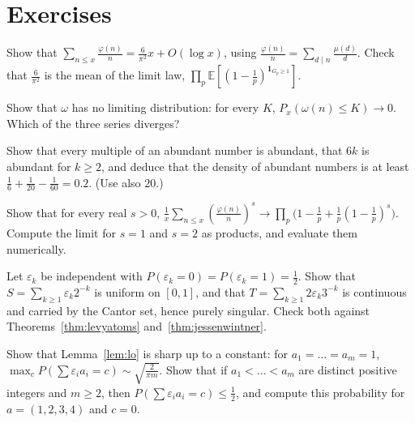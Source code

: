 \section{Exercises}

\begin{exercise}[$\star$]\label{ex:meanphi}
Show that $\sum_{n\le x}\frac{\varphi(n)}n=\frac6{\pi^2}x+O(\log x)$, using $\frac{\varphi(n)}n=\sum_{d\mid n}\frac{\mu(d)}d$. Check that $\frac6{\pi^2}$ is the mean of the limit law, $\prod_p\mathbb E[(1-\frac1p)^{\mathbf 1_{G_p\ge1}}]$.
\end{exercise}

\begin{exercise}[$\star$]\label{ex:omeganolimit}
Show that $\omega$ has no limiting distribution: for every $K$, $P_x(\omega(n)\le K)\to0$. Which of the three series diverges?
\end{exercise}

\begin{exercise}[$\star$]\label{ex:abundant6}
Show that every multiple of an abundant number is abundant, that $6k$ is abundant for $k\ge2$, and deduce that the density of abundant numbers is at least $\frac16+\frac1{20}-\frac1{60}=0.2$. (Use also $20$.)
\end{exercise}

\begin{exercise}[$\star\star$]\label{ex:phimoments}
Show that for every real $s>0$, $\frac1x\sum_{n\le x}(\frac{\varphi(n)}n)^s\to\prod_p\bigl(1-\frac1p+\frac1p(1-\frac1p)^s\bigr)$. Compute the limit for $s=1$ and $s=2$ as products, and evaluate them numerically.
\end{exercise}

\begin{exercise}[$\star\star$]\label{ex:purity}
Let $\varepsilon_k$ be independent with $P(\varepsilon_k=0)=P(\varepsilon_k=1)=\frac12$. Show that $S=\sum_{k\ge1}\varepsilon_k2^{-k}$ is uniform on $[0,1]$, and that $T=\sum_{k\ge1}2\varepsilon_k3^{-k}$ is continuous and carried by the Cantor set, hence purely singular. Check both against Theorems~\ref{thm:levyatoms} and~\ref{thm:jessenwintner}.
\end{exercise}

\begin{exercise}[$\star\star$]\label{ex:losharp}
Show that Lemma~\ref{lem:lo} is sharp up to a constant: for $a_1=\dots=a_m=1$, $\max_cP(\sum\varepsilon_ia_i=c)\sim\sqrt{\frac2{\pi m}}$. Show that if $a_1<\dots<a_m$ are distinct positive integers and $m\ge2$, then $P(\sum\varepsilon_ia_i=c)\le\frac12$, and compute this probability for $a=(1,2,3,4)$ and $c=0$.
\end{exercise}

